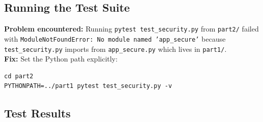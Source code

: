 \documentclass[12pt,a4paper]{report}
\begin{document}
\subsection{Running the Test Suite}

\begin{warningbox}
\textbf{Problem encountered:} Running \texttt{pytest test\_security.py} from \texttt{part2/} failed with \texttt{ModuleNotFoundError: No module named 'app\_secure'} because \texttt{test\_security.py} imports from \texttt{app\_secure.py} which lives in \texttt{part1/}.\\[4pt]
\textbf{Fix:} Set the Python path explicitly:
\begin{lstlisting}[style=bashstyle]
cd part2
PYTHONPATH=../part1 pytest test_security.py -v
\end{lstlisting}
\end{warningbox}

\subsection{Test Results}
\end{document}
